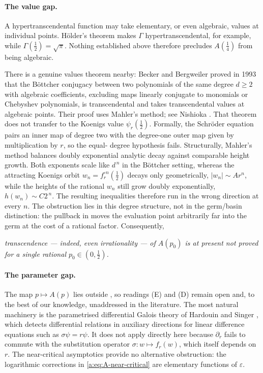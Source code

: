 \paragraph{The value gap.}
A hypertranscendental function may take elementary, or even algebraic, values at
individual points.  H\"older's theorem makes $\Gamma$ hypertranscendental, for
example, while $\Gamma(\tfrac12)=\sqrt{\pi}$.  Nothing established above therefore
precludes $A(\tfrac14)$ from being algebraic.

There is a genuine values theorem nearby: Becker and Bergweiler proved in 1993
\cite{Becker1993} that the B\"ottcher conjugacy between two polynomials of the same
degree $d\geq2$ with algebraic coefficients, excluding maps linearly conjugate to
monomials or Chebyshev polynomials, is transcendental and takes transcendental
values at algebraic points.  Their proof uses Mahler's method; see Nishioka
\cite{Nishioka1996}.  That theorem does not transfer to the Koenigs value
$\psi_r(\tfrac12)$.  Formally, the Schr\"oder equation pairs an inner map of degree
two with the degree-one outer map given by multiplication by $r$, so the equal-
degree hypothesis fails.  Structurally, Mahler's method balances doubly exponential
analytic decay against comparable height growth.  Both exponents scale like
$d^{\,n}$ in the B\"ottcher setting, whereas the attracting Koenigs orbit
$w_n=f_r^{\circ n}(\tfrac12)$ decays only geometrically,
$|w_n|\sim Ar^n$, while the heights of the rational $w_n$ still grow doubly
exponentially, $h(w_n)\sim C2^{\,n}$.  The resulting inequalities therefore run in
the wrong direction at every $n$.  The obstruction lies in this degree structure,
not in the germ/basin distinction: the pullback in  moves the
evaluation point arbitrarily far into the germ at the cost of a rational factor.
Consequently,
\begin{center}
\emph{transcendence --- indeed, even irrationality --- of $A(p_0)$ is at present not proved\\ for a single rational $p_0\in(0,\tfrac12)$.}
\end{center}

\paragraph{The parameter gap.}
The map $p\mapsto A(p)$ lies outside , so readings (E) and
(D) remain open and, to the best of our knowledge, unaddressed in the literature.
The most natural machinery is the parametrised differential Galois theory of
Hardouin and Singer \cite{HardouinSinger2008}, which detects differential
relations in auxiliary directions for linear difference equations such as
$\sigma\psi=r\psi$.  It does not apply directly here because $\partial_r$ fails to
commute with the substitution operator $\sigma\colon w\mapsto f_r(w)$, which itself
depends on $r$.  The near-critical asymptotics provide no alternative obstruction:
the logarithmic corrections in \eqref{a:eq:A-near-critical} are elementary
functions of $\varepsilon$.

